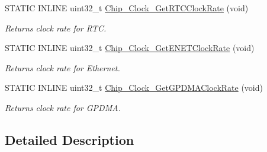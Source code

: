 \begin{DoxyCompactItemize}
S\+T\+A\+T\+I\+C I\+N\+L\+I\+N\+E uint32\+\_\+t \hyperlink{group___c_l_o_c_k__17_x_x__40_x_x_ga7c09db016cc48f17aca47d96b0d68814}{Chip\+\_\+\+Clock\+\_\+\+Get\+R\+T\+C\+Clock\+Rate} (void)
\begin{DoxyCompactList}\small\item\em Returns clock rate for R\+T\+C. \end{DoxyCompactList}\item 
S\+T\+A\+T\+I\+C I\+N\+L\+I\+N\+E uint32\+\_\+t \hyperlink{group___c_l_o_c_k__17_x_x__40_x_x_ga04af0fa6fa72517538fc3d3918fcc0d9}{Chip\+\_\+\+Clock\+\_\+\+Get\+E\+N\+E\+T\+Clock\+Rate} (void)
\begin{DoxyCompactList}\small\item\em Returns clock rate for Ethernet. \end{DoxyCompactList}\item 
S\+T\+A\+T\+I\+C I\+N\+L\+I\+N\+E uint32\+\_\+t \hyperlink{group___c_l_o_c_k__17_x_x__40_x_x_ga3141accbf546f4de8cfb005e31ec53a8}{Chip\+\_\+\+Clock\+\_\+\+Get\+G\+P\+D\+M\+A\+Clock\+Rate} (void)
\begin{DoxyCompactList}\small\item\em Returns clock rate for G\+P\+D\+M\+A. \end{DoxyCompactList}\end{DoxyCompactItemize}


\subsection{Detailed Description}


